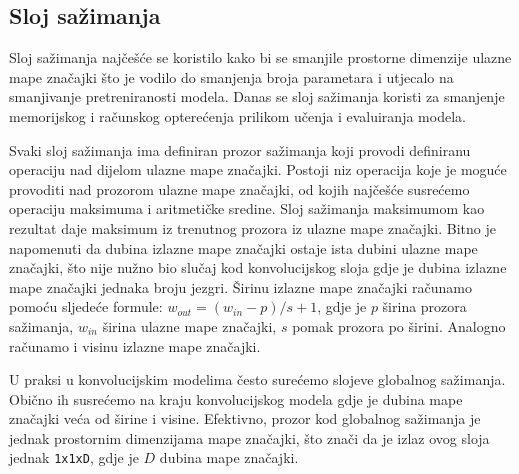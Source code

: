 \documentclass[times, utf8, diplomski,  numeric]{fer}
\begin{document}
\subsection{Sloj sažimanja}
Sloj sažimanja najčešće se koristilo kako bi se smanjile prostorne dimenzije ulazne mape značajki što je vodilo do smanjenja broja parametara i utjecalo na smanjivanje pretreniranosti modela. Danas se sloj sažimanja koristi za smanjenje memorijskog i računskog opterećenja prilikom učenja i evaluiranja modela.
\par
 Svaki sloj sažimanja ima definiran prozor sažimanja koji provodi definiranu operaciju nad dijelom ulazne mape značajki. Postoji niz operacija koje je moguće provoditi nad prozorom ulazne mape značajki, od kojih najčešće susrećemo operaciju maksimuma i aritmetičke sredine. Sloj sažimanja maksimumom kao rezultat daje maksimum iz trenutnog prozora iz ulazne mape značajki. Bitno je napomenuti da dubina izlazne mape značajki ostaje ista dubini ulazne mape značajki, što nije nužno bio slučaj kod konvolucijskog sloja gdje je dubina izlazne mape značajki jednaka broju jezgri. Širinu izlazne mape značajki računamo pomoću sljedeće formule: \( w_{out}=(w_{in}-p)/s+1\), gdje je $p$ širina prozora sažimanja, $w_{in}$ širina ulazne mape značajki, $s$ pomak prozora po širini. Analogno računamo i visinu izlazne mape značajki.
\par
U praksi u konvolucijskim modelima često surećemo slojeve globalnog sažimanja. Obično ih susrećemo na kraju konvolucijskog modela gdje je dubina mape značajki veća od širine i visine. Efektivno, prozor kod globalnog sažimanja je jednak prostornim dimenzijama mape značajki, što znači da je izlaz ovog sloja jednak \verb|1x1xD|, gdje je  $D$ dubina mape značajki.
\end{document}
